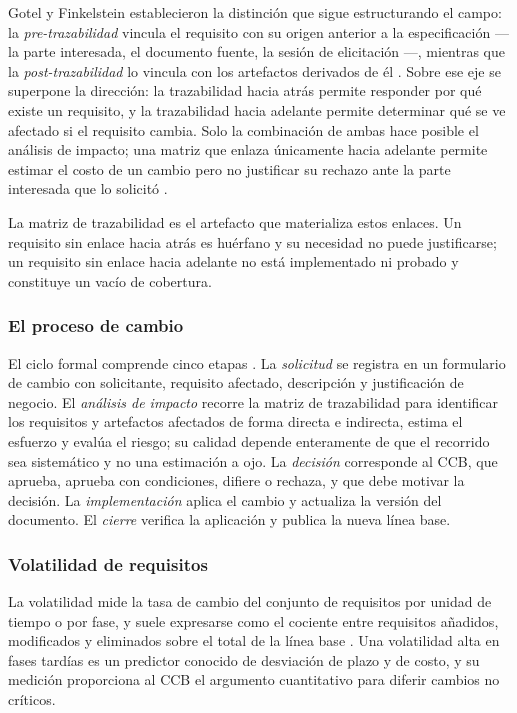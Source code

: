 \documentclass[11pt,letterpaper]{article}
\begin{document}
Gotel y Finkelstein establecieron la distinción que sigue estructurando el campo: la
\emph{pre-trazabilidad} vincula el requisito con su origen anterior a la especificación --- la parte
interesada, el documento fuente, la sesión de elicitación ---, mientras que la
\emph{post-trazabilidad} lo vincula con los artefactos derivados de él \cite{gotel1994}. Sobre ese eje
se superpone la dirección: la trazabilidad hacia atrás permite responder por qué existe un
requisito, y la trazabilidad hacia adelante permite determinar qué se ve afectado si el requisito
cambia. Solo la combinación de ambas hace posible el análisis de impacto; una matriz que enlaza
únicamente hacia adelante permite estimar el costo de un cambio pero no justificar su rechazo ante
la parte interesada que lo solicitó \cite{clelandhuang2012}.

La matriz de trazabilidad es el artefacto que materializa estos enlaces. Un requisito sin enlace
hacia atrás es huérfano y su necesidad no puede justificarse; un requisito sin enlace hacia adelante
no está implementado ni probado y constituye un vacío de cobertura.

\subsubsection*{El proceso de cambio}

El ciclo formal comprende cinco etapas \cite{pmbok7, wiegers2013}. La \emph{solicitud} se registra en
un formulario de cambio con solicitante, requisito afectado, descripción y justificación de negocio.
El \emph{análisis de impacto} recorre la matriz de trazabilidad para identificar los requisitos y
artefactos afectados de forma directa e indirecta, estima el esfuerzo y evalúa el riesgo; su calidad
depende enteramente de que el recorrido sea sistemático y no una estimación a ojo. La \emph{decisión}
corresponde al CCB, que aprueba, aprueba con condiciones, difiere o rechaza, y que debe motivar la
decisión. La \emph{implementación} aplica el cambio y actualiza la versión del documento. El
\emph{cierre} verifica la aplicación y publica la nueva línea base.

\subsubsection*{Volatilidad de requisitos}

La volatilidad mide la tasa de cambio del conjunto de requisitos por unidad de tiempo o por fase, y
suele expresarse como el cociente entre requisitos añadidos, modificados y eliminados sobre el total
de la línea base \cite{wiegers2013}. Una volatilidad alta en fases tardías es un predictor conocido
de desviación de plazo y de costo, y su medición proporciona al CCB el argumento cuantitativo para
diferir cambios no críticos.
\end{document}
